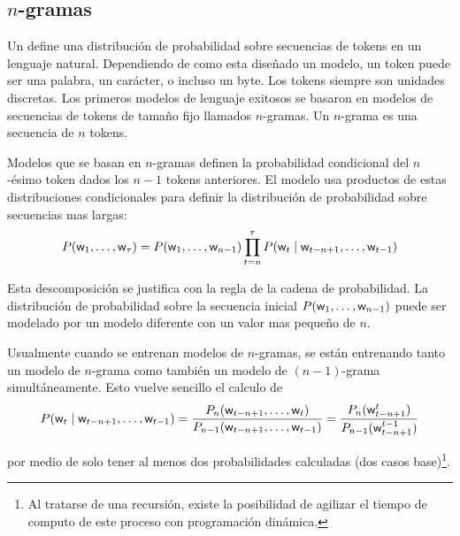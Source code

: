 \subsubsection{}


\subsection{$n$-gramas}
Un  define una distribución de probabilidad sobre secuencias de tokens en un lenguaje natural. Dependiendo de como esta diseñado un modelo, un token puede ser una palabra, un carácter, o incluso un byte. Los tokens siempre son unidades discretas. Los primeros modelos de lenguaje exitosos se basaron en modelos de secuencias de tokens de tamaño fijo llamados $n$-gramas. Un $n$-grama es una secuencia de $n$ tokens.

Modelos que se basan en $n$-gramas definen la probabilidad condicional del $n$-ésimo token dados los $n-1$ tokens anteriores. El modelo usa productos de estas distribuciones condicionales para definir la distribución de probabilidad sobre secuencias mas largas:
\begin{equation}
  P({\mathit{\mathsf{w}}}_1, \ldots, {\mathit{\mathsf{w}}}_\tau) = P({\mathit{\mathsf{w}}}_1, \ldots, {\mathit{\mathsf{w}}}_{n-1}) \prod_{t = n}^{\tau} P({\mathit{\mathsf{w}}}_t \mid {\mathit{\mathsf{w}}}_{t-n+1}, \ldots, {\mathit{\mathsf{w}}}_{t-1})
\end{equation}

Esta descomposición se justifica con la regla de la cadena de probabilidad. La distribución de probabilidad sobre la secuencia inicial $P({\mathit{\mathsf{w}}}_1, \ldots, {\mathit{\mathsf{w}}}_{n-1})$ puede ser modelado por un modelo diferente con un valor mas pequeño de $n$.

Usualmente cuando se entrenan modelos de $n$-gramas, se están entrenando tanto un modelo de $n$-grama como también un modelo de $(n-1)$-grama simultáneamente. Esto vuelve sencillo el calculo de
\begin{equation}
  P({\mathit{\mathsf{w}}}_t \mid {\mathit{\mathsf{w}}}_{t-n+1}, \ldots, {\mathit{\mathsf{w}}}_{t-1}) = \frac{P_n({\mathit{\mathsf{w}}}_{t-n+1}, \ldots, {\mathit{\mathsf{w}}}_t)}{P_{n-1}({\mathit{\mathsf{w}}}_{t-n+1}, \ldots, {\mathit{\mathsf{w}}}_{t-1})} = \frac{P_n({\mathit{\mathsf{w}}}_{t-n+1}^{t})}{P_{n-1}({\mathit{\mathsf{w}}}_{t-n+1}^{t-1})}
\end{equation}

por medio de solo tener al menos dos probabilidades calculadas (dos casos base)\footnote{Al tratarse de una recursión, existe la posibilidad de agilizar el tiempo de computo de este proceso con programación dinámica.}.

